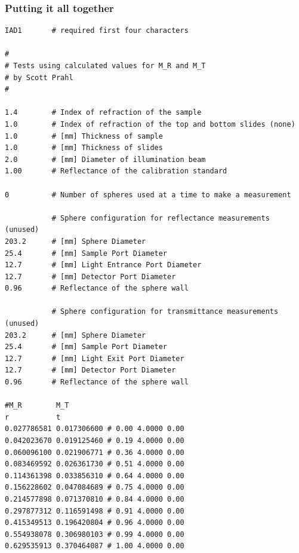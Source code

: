 \documentclass{article}
\begin{document}
\subsubsection{Putting it all together}
\begin{table}
\begin{center}
\begin{minipage}{10cm}
\scriptsize
\begin{verbatim}
IAD1       # required first four characters

#
# Tests using calculated values for M_R and M_T
# by Scott Prahl
#

1.4        # Index of refraction of the sample
1.0        # Index of refraction of the top and bottom slides (none)
1.0        # [mm] Thickness of sample
1.0        # [mm] Thickness of slides
2.0        # [mm] Diameter of illumination beam
1.00       # Reflectance of the calibration standard

0          # Number of spheres used at a time to make a measurement

           # Sphere configuration for reflectance measurements (unused)
203.2      # [mm] Sphere Diameter
25.4       # [mm] Sample Port Diameter
12.7       # [mm] Light Entrance Port Diameter
12.7       # [mm] Detector Port Diameter
0.96       # Reflectance of the sphere wall

           # Sphere configuration for transmittance measurements (unused)
203.2      # [mm] Sphere Diameter
25.4       # [mm] Sample Port Diameter
12.7       # [mm] Light Exit Port Diameter
12.7       # [mm] Detector Port Diameter
0.96       # Reflectance of the sphere wall

#M_R        M_T
r           t
0.027786581 0.017306600 # 0.00 4.0000 0.00
0.042023670 0.019125460 # 0.19 4.0000 0.00
0.060096100 0.021906771 # 0.36 4.0000 0.00
0.083469592 0.026361730 # 0.51 4.0000 0.00
0.114361398 0.033856310 # 0.64 4.0000 0.00
0.156228602 0.047084689 # 0.75 4.0000 0.00
0.214577898 0.071370810 # 0.84 4.0000 0.00
0.297877312 0.116591498 # 0.91 4.0000 0.00
0.415349513 0.196420804 # 0.96 4.0000 0.00
0.554938078 0.306980103 # 0.99 4.0000 0.00
0.629535913 0.370464087 # 1.00 4.0000 0.00
\end{verbatim}
\end{minipage}
\end{center}
\caption{One of the test files \texttt{basic\_D.rxt}.  This is a test file
with accurately calculated values for $M_R$ and $M_T$.  As a consequence
the number of spheres has been set to zero.  Other test files in the
\texttt{tests/rxt} directory, grouped by the number of spheres used, may be
helpful starting templates for your data.}
\end{table}
\end{document}
